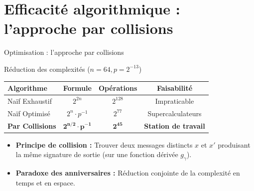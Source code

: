 \section{Efficacité algorithmique : l'approche par collisions}

\begin{frame}{Optimisation : l’approche par collisions}
    
    \begin{block}{Réduction des complexités ($n=64, p=2^{-13}$)}
        \centering
        \renewcommand{\arraystretch}{1.3}
        \small
        \begin{tabular}{lccc}
            \toprule
            \textbf{Algorithme} & \textbf{Formule} & \textbf{Opérations} & \textbf{Faisabilité} \\
            \midrule
            Naïf Exhaustif & $2^{2n}$ & $2^{128}$ & Impraticable \\
            Naïf Optimisé  & $2^n \cdot p^{-1}$ & $2^{77}$ & Supercalculateurs \\
            \midrule
            \textbf{Par Collisions} & $\mathbf{2^{n/2} \cdot p^{-1}}$ & $\mathbf{2^{45}}$ & \textbf{Station de travail} \\
            \bottomrule
        \end{tabular}
    \end{block}

    \vspace{0.4cm}

    \begin{itemize}
        \item \textbf{Principe de collision :} Trouver deux messages distincts $x$ et $x'$ produisant la même signature de sortie (sur une fonction dérivée $g_\gamma$).
        \item \textbf{Paradoxe des anniversaires :} Réduction conjointe de la complexité en temps et en espace.
    \end{itemize}
    
\end{frame}

